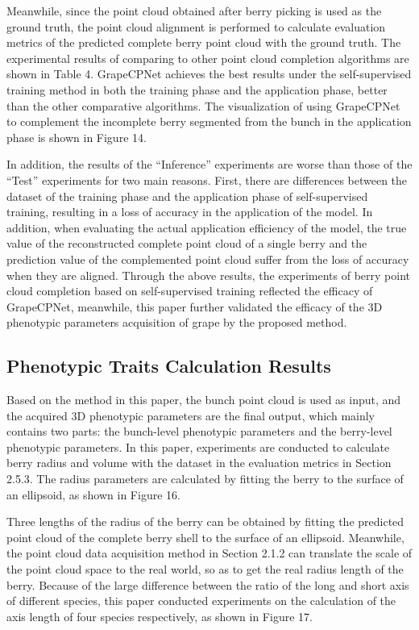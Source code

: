 \documentclass[12pt]{article}
\begin{document}
Meanwhile, since the point cloud obtained after berry picking is used as the ground truth, the point cloud alignment is performed to calculate evaluation metrics of the predicted complete berry point cloud with the ground truth.
The experimental results of comparing to other point cloud completion algorithms are shown in Table 4. 
GrapeCPNet achieves the best results under the self-supervised training method in both the training phase and the application phase, better than the other comparative algorithms. 
The visualization of using GrapeCPNet to complement the incomplete berry segmented from the bunch in the application phase is shown in Figure 14.



In addition, the results of the ``Inference'' experiments are worse than those of the ``Test'' experiments for two main reasons.
First, there are differences between the dataset of the training phase and the application phase of self-supervised training, resulting in a loss of accuracy in the application of the model. 
In addition, when evaluating the actual application efficiency of the model, the true value of the reconstructed complete point cloud of a single berry and the prediction value of the complemented point cloud suffer from the loss of accuracy when they are aligned.
Through the above results, the experiments of berry point cloud completion based on self-supervised training reflected the efficacy of GrapeCPNet, meanwhile, this paper further validated the efficacy of the 3D phenotypic parameters acquisition of grape by the proposed method.

\subsection{Phenotypic Traits Calculation Results}

Based on the method in this paper, the bunch point cloud is used as input, and the acquired 3D phenotypic parameters are the final output, which mainly contains two parts: the bunch-level phenotypic parameters and the berry-level phenotypic parameters.
In this paper, experiments are conducted to calculate berry radius and volume with the dataset in the evaluation metrics in 
Section 2.5.3.
The radius parameters are calculated by fitting the berry to the surface of an ellipsoid, as shown in Figure 16.


Three lengths of the radius of the berry can be obtained by fitting the predicted point cloud of the complete berry shell to the surface of an ellipsoid. 
Meanwhile, the point cloud data acquisition method in 
Section 2.1.2 can translate the scale of the point cloud space to the real world, so as to get the real radius length of the berry.
Because of the large difference between the ratio of the long and short axis of different species, this paper conducted experiments on the calculation of the axis length of four species respectively, as shown in Figure 17.
\end{document}
